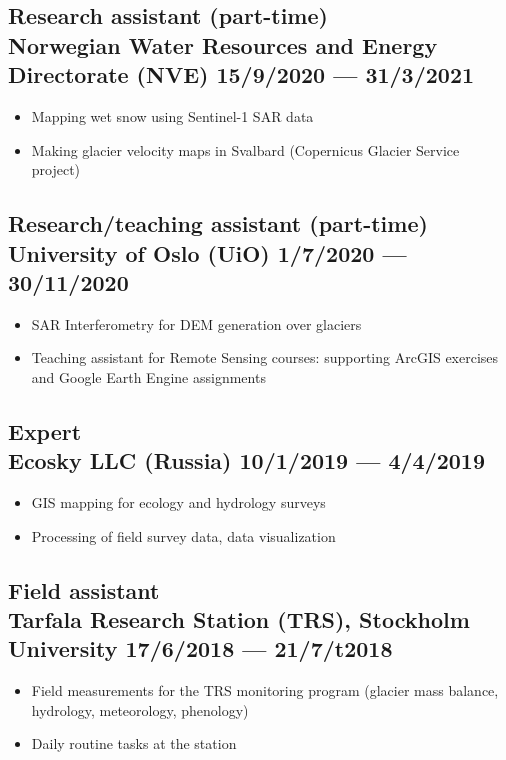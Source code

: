 \documentclass[a4,10pt]{article}
\newenvironment{zitemize}{
\begin{itemize}\itemsep2pt \parskip0pt \parsep1pt}
{\end{itemize}\vspace{-0.5cm}}
\begin{document}
\subsection*{Research assistant (part-time) \\ Norwegian Water Resources and Energy Directorate (NVE) \hfill 15/9/2020 --- 31/3/2021} 
    \begin{zitemize}
        \item Mapping wet snow using Sentinel-1 SAR data
        \item Making glacier velocity maps in Svalbard (Copernicus Glacier Service project)
    \end{zitemize}

    
\subsection*{Research/teaching assistant (part-time) \\University of Oslo (UiO) \hfill 1/7/2020 --- 30/11/2020} 
    \begin{zitemize}
        \item SAR Interferometry for DEM generation over glaciers 
        \item Teaching assistant for Remote Sensing courses: supporting ArcGIS exercises and Google Earth Engine assignments
    \end{zitemize}  
    
\subsection*{Expert \\Ecosky LLC (Russia) \hfill 10/1/2019 --- 4/4/2019} 
    \begin{zitemize}
        \item GIS mapping for ecology and hydrology surveys
        \item Processing of field survey data, data visualization
    \end{zitemize}  
    
\subsection*{Field assistant \\Tarfala Research Station (TRS), Stockholm University \hfill 17/6/2018 --- 21/7/t2018} 
    \begin{zitemize}
        \item Field measurements for the TRS monitoring program (glacier mass balance, hydrology, meteorology, phenology)
        \item Daily routine tasks at the station
    \end{zitemize}  
\end{document}
